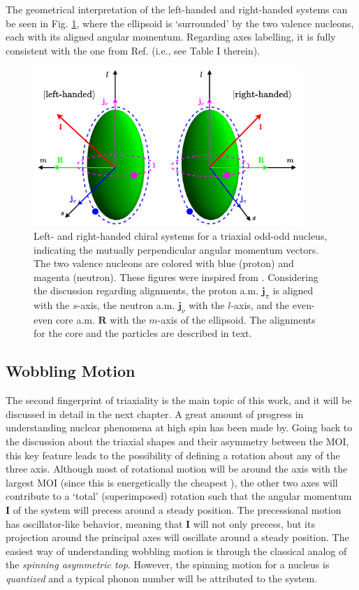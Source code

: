 The geometrical interpretation of the left-handed and right-handed systems can be seen in Fig. \ref{chiral-geometry}, where the ellipsoid is `surrounded' by the two valence nucleons, each with its aligned angular momentum. Regarding axes labelling, it is fully consistent with the one from Ref. \cite{frauendorf2001spontaneous} (i.e., see Table I therein).
\begin{figure}
    \centering
    \includegraphics[width=0.9\textwidth]{Chapters/Figures/chiral_handedness.pdf}
    \caption{Left- and right-handed chiral systems for a triaxial odd-odd nucleus, indicating the mutually perpendicular angular momentum vectors. The two valence nucleons are colored with blue (proton) and magenta (neutron). These figures were inspired from \cite{starosta2001chiral}. Considering the discussion regarding alignments, the proton a.m. $\mathbf{j}_\pi$ is aligned with the $s$-axis, the neutron a.m. $\mathbf{j}_\nu$ with the $l$-axis, and the even-even core a.m. $\mathbf{R}$ with the $m$-axis of the ellipsoid. The alignments for the core and the particles are described in text.}
    \label{chiral-geometry}
\end{figure}

\subsection{Wobbling Motion}

The second fingerprint of triaxiality is the main topic of this work, and it will be discussed in detail in the next chapter. A great amount of progress in understanding nuclear phenomena at high spin has been made by. Going back to the discussion about the triaxial shapes and their asymmetry between the MOI, this key feature leads to the possibility of defining a rotation about any of the three axis. Although most of rotational motion will be around the axis with the largest MOI (since this is energetically the cheapest \cite{bohr1954rotational}), the other two axes will contribute to a `total' (superimposed) rotation such that the angular momentum $\mathbf{I}$ of the system will precess around a steady position. The precessional motion has oscillator-like behavior, meaning that $\mathbf{I}$ will not only precess, but its projection around the principal axes will oscillate around a steady position. The easiest way of understanding wobbling motion is through the classical analog of the \emph{spinning asymmetric top}. However, the spinning motion for a nucleus is \emph{quantized} and a typical phonon number will be attributed to the system.

